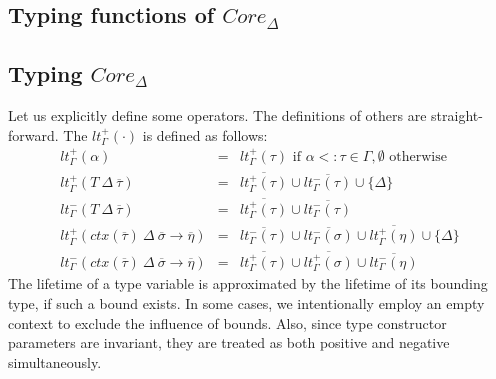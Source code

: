 \documentclass[11pt]{article}
\newcommand{\ap}{~}
\newcommand{\ctx}[1]{ctx\left(#1\right)~}
\begin{document}
    \subsection{Typing functions of $Core_\Delta$}






    \subsection{Typing $Core_\Delta$}

    Let us explicitly define some operators.
    The definitions of others are straight-forward.
    The $lt_\Gamma^+(\cdot)$ is defined as follows:
    \[
        \begin{array}{lll}
            lt_\Gamma^+(\alpha) & = & lt_\Gamma^+(\tau) \text{ if } \alpha <: \tau \in \Gamma, \emptyset \text{ otherwise} \\
            lt_\Gamma^+(T\ap\Delta\ap\overline{\tau}) & = & \overline{lt_\Gamma^+(\tau)} \cup \overline{lt_\Gamma^-(\tau)} \cup \{\Delta\} \\
            lt_\Gamma^-(T\ap\Delta\ap\overline{\tau}) & = & \overline{lt_\Gamma^+(\tau)} \cup \overline{lt_\Gamma^-(\tau)} \\
            lt_\Gamma^{+}(\ctx{\overline{\tau}}\Delta~\overline{\sigma}\to\overline{\eta}) & = & \overline{lt_\Gamma^{-}(\tau)} \cup \overline{lt_\Gamma^{-}(\sigma)} \cup \overline{lt_\Gamma^{+}(\eta)} \cup \{\Delta\} \\
            lt_\Gamma^{-}(\ctx{\overline{\tau}}\Delta~\overline{\sigma}\to\overline{\eta}) & = & \overline{lt_\Gamma^{+}(\tau)} \cup \overline{lt_\Gamma^{+}(\sigma)} \cup \overline{lt_\Gamma^{-}(\eta)}
        \end{array}
    \]
    The lifetime of a type variable is approximated by the lifetime of its bounding type, if such a bound exists.
    In some cases, we intentionally employ an empty context to exclude the influence of bounds.
    Also, since type constructor parameters are invariant, they are treated as both positive and negative simultaneously.
\end{document}
